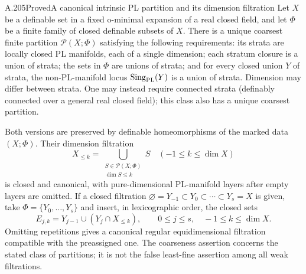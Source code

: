 \begin{saresult}{A.205}{Proved}{A canonical intrinsic PL partition and its dimension filtration}
Let $X$ be a definable set in a fixed o-minimal expansion
of a real closed field, and let $\Phi$ be a finite family of closed
definable subsets of $X$. There is a unique coarsest finite
partition $\mathcal P(X;\Phi)$ satisfying the following requirements:
its strata are locally closed PL manifolds, each of a single dimension;
each stratum closure is a union of strata; the sets in $\Phi$ are
unions of strata; and for every closed union $Y$ of strata, the
non-PL-manifold locus $\operatorname{Sing}_{\rm PL}(Y)$ is a union
of strata. Dimension may differ between strata. One may instead
require connected strata (definably connected over a general real
closed field); this class also has a unique coarsest
partition.

Both versions are preserved by definable homeomorphisms of the
marked data $(X;\Phi)$. Their dimension filtration
\[
 X_{\le k}=\bigcup_{\substack{S\in\mathcal P(X;\Phi)\\\dim S\le k}}S
 \quad(-1\le k\le\dim X)
\]
is closed and canonical, with pure-dimensional PL-manifold layers
after empty layers are omitted. If a closed filtration
$\varnothing=Y_{-1}\subset Y_0\subset\cdots\subset Y_s=X$ is
given, take $\Phi=\{Y_0,\ldots,Y_s\}$ and insert, in lexicographic
order, the closed sets
\[
 E_{j,k}=Y_{j-1}\cup(Y_j\cap X_{\le k}),
 \qquad 0\le j\le s,\quad -1\le k\le\dim X.
\]
Omitting repetitions gives a canonical regular equidimensional
filtration compatible with the preassigned one. The coarseness
assertion concerns the stated class of partitions; it is not the
false least-fine assertion among all weak filtrations.
\end{saresult}
